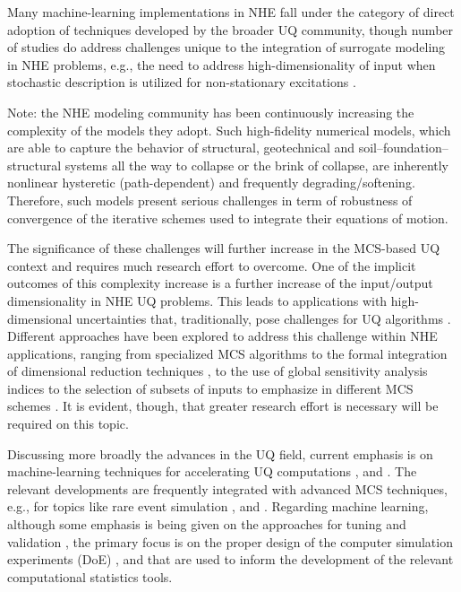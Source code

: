 Many machine-learning implementations in NHE fall under the category of direct adoption of techniques developed by the broader UQ community, though number of studies do address challenges unique to the integration of surrogate modeling in NHE problems, e.g., the need to address high-dimensionality of input when stochastic description is utilized for non-stationary excitations \citep{gidaris2015kriging}.  

Note: the NHE modeling community has been continuously increasing the complexity of the models they adopt. Such high-fidelity numerical models, which are able to capture the behavior of structural, geotechnical and soil--foundation--structural systems all the way to collapse or the brink of collapse, are inherently nonlinear hysteretic (path-dependent) and frequently degrading/softening. Therefore, such models present serious challenges in term of robustness of convergence of the iterative schemes used to integrate their equations of motion.

The significance of these challenges will further increase in the MCS-based UQ context and requires much research effort to overcome. One of the implicit outcomes of this complexity increase is a further increase of the input/output dimensionality in NHE UQ problems. This leads to applications with high-dimensional uncertainties that, traditionally, pose challenges for UQ algorithms \citep{au2003importance,schueller2004critical}. Different approaches have been explored to address this challenge within NHE applications, ranging from specialized MCS algorithms \citep{au2001estimation, wang2016crossentropybased} to the formal integration of dimensional reduction techniques \citep{jia2013kriging}, to the use of global sensitivity analysis indices to the selection of subsets of inputs to emphasize in different MCS schemes \citep{jia2014adaptive}. It is evident, though, that greater research effort is necessary will be required on this topic.     

Discussing more broadly the advances in the UQ field, current emphasis is on machine-learning techniques for accelerating UQ computations \citep{murphy2012machine, ghanem2017handbook}, and \citep{tripathy2018deep}. The relevant developments are frequently integrated with advanced MCS techniques, e.g., for topics like rare event simulation \citep{li2011efficient,balesdent2013krigingbased}, and \citep{bourinet2016rareevent}. Regarding machine learning, although some emphasis is being given on the approaches for tuning and validation \citep{mehmani2018concurrent}, the primary focus is on the proper design of the computer simulation experiments (DoE) \citep{kleijnen2008design, picheny2010adaptive}, and \citep{kyprioti2020adaptive} that are used to inform the development of the relevant computational statistics tools.

